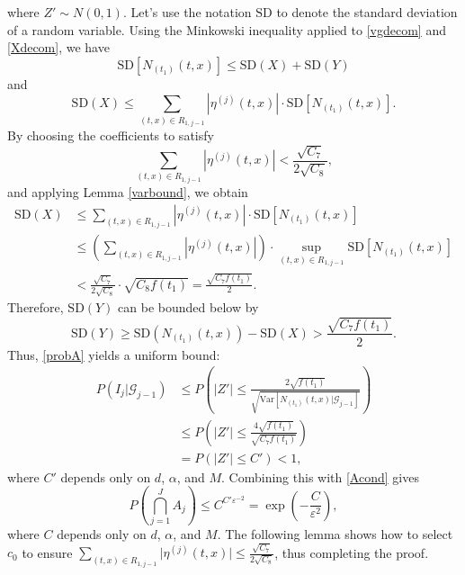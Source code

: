 \documentclass[12pt]{amsart}
\numberwithin{equation}{section}
\newcommand{\1}{\mathbf{1}}
\begin{document}
where $Z'\sim N(0,1)$. Let's use the notation $\textrm{SD}$ to denote the standard deviation of a random variable. Using the Minkowski inequality applied to \eqref{vgdecom} and \eqref{Xdecom}, we have
\[\textrm{SD}[N_{(t_1)}(t,x)]\leq \textrm{SD}(X)+\textrm{SD}(Y)\]
and
\[\textrm{SD}(X)\leq \sum_{(t,x)\in R_{1,j-1}}\left\vert\eta^{(j)}(t,x)\right\vert\cdot \textrm{SD}[N_{(t_1)}(t,x)].\]
By choosing the coefficients to satisfy
\[\sum_{(t,x)\in R_{1,j-1}}\left\vert\eta^{(j)}(t,x)\right\vert<\frac{\sqrt{C_7}}{2\sqrt{C_8}},\]
and applying Lemma \ref{varbound}, we obtain
\begin{equation*}
\begin{split}
\textrm{SD}(X)&\leq \sum_{(t,x)\in R_{1,j-1}}\left\vert\eta^{(j)}(t,x)\right\vert\cdot \textrm{SD}[N_{(t_1)}(t,x)]\\
&\leq \left(\sum_{(t,x)\in R_{1,j-1}}\left\vert\eta^{(j)}(t,x)\right\vert\right)\cdot\sup_{(t,x)\in R_{1,j-1}}\textrm{SD}[N_{(t_1)}(t,x)]\\
&<\frac{\sqrt{C_7}}{2\sqrt{C_8}}\cdot \sqrt{C_8f(t_1)}=\frac{\sqrt{C_7f(t_1)}}{2}.
\end{split}
\end{equation*}
Therefore, $\textrm{SD}(Y)$ can be bounded below by
\begin{equation*}
\textrm{SD}(Y)\geq \textrm{SD}(N_{(t_1)}(t,x)) - \textrm{SD}(X)>\frac{\sqrt{C_7f(t_1)}}{2}.
\end{equation*}
Thus, \eqref{probA} yields a uniform bound:
\begin{equation*}
\begin{split}
P(I_j\vert \mathcal{G}_{j-1})&\leq P\left(\vert Z'\vert\leq \frac{2\sqrt{f(t_1)}}{\sqrt{\textrm{Var}[N_{(t_1)}(t,x)\vert \mathcal{G}_{j-1}]}}\right)\\
&\leq P\left(\vert Z'\vert\leq \frac{4\sqrt{f(t_1)}}{\sqrt{C_7 f(t_1)}}\right)\\
&=P\left(\vert Z'\vert\leq C'\right)<1,
\end{split}
\end{equation*}
where $C'$ depends only on $d$, $\alpha$, and $M$. Combining this with \eqref{Acond} gives
\begin{equation}
\label{probAbound}
P\left(\bigcap_{j=1}^{J}A_j\right)\leq C^{C'\varepsilon^{-2}}=\exp\left(-\frac{C}{\varepsilon^2}\right),
\end{equation}
where $C$ depends only on $d$, $\alpha$, and $M$. The following lemma shows how to select $c_0$ to ensure $\sum\limits_{(t,x)\in R_{1,j-1}}\vert\eta^{(j)}(t,x)\vert\leq \frac{\sqrt{C_7}}{2\sqrt{C_8}}$, thus completing the proof.
\end{document}
